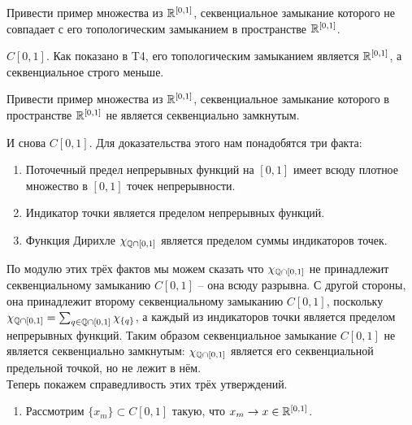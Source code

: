 \begin{task}[T9]
    Привести пример множества из $\mathbb{R}^{[0, 1]}$, секвенциальное замыкание которого не совпадает с его топологическим замыканием в пространстве $\mathbb{R}^{[0, 1]}$.
\end{task}
\begin{solve}
    $C[0, 1]$. Как показано в T4, его топологическим замыканием является $\mathbb{R}^{[0, 1]}$, а секвенциальное строго меньше.
\end{solve}
\begin{task}[T10]
    Привести пример множества из $\mathbb{R}^{[0, 1]}$, секвенциальное замыкание которого в пространстве $\mathbb{R}^{[0, 1]}$ не является секвенциально замкнутым.
\end{task}
\begin{solve}
    И снова $C[0, 1]$. Для доказательства этого нам понадобятся три факта:
    \begin{enumerate}
        \item Поточечный предел непрерывных функций на $[0, 1]$ имеет всюду плотное множество в $[0, 1]$ точек непрерывности.
        \item Индикатор точки является пределом непрерывных функций.
        \item Функция Дирихле $\chi_{\mathbb{Q} \cap [0, 1]}$ является пределом суммы индикаторов точек.
    \end{enumerate}
    По модулю этих трёх фактов мы можем сказать что $\chi_{\mathbb{Q} \cap [0, 1]}$ не принадлежит секвенциальному замыканию $C[0, 1]$ -- она всюду разрывна. С другой стороны, она принадлежит второму секвенциальному замыканию $C[0, 1]$, поскольку $\chi_{\mathbb{Q} \cap [0, 1]} = \sum_{q \in \mathbb{Q} \cap [0, 1]} \chi_{\{q\}}$, а каждый из индикаторов точки является пределом непрерывных функций. Таким образом секвенциальное замыкание $C[0, 1]$ не является секвенциально замкнутым: $\chi_{\mathbb{Q} \cap [0, 1]}$ является его секвенциальной предельной точкой, но не лежит в нём. \\
    Теперь покажем справедливость этих трёх утверждений.
    \begin{enumerate}
        \item Рассмотрим $\{x_m\} \subset C[0, 1]$ такую, что $x_m \rightarrow x \in \mathbb{R}^{[0, 1]}$.


\end{enumerate}
\end{solve}
